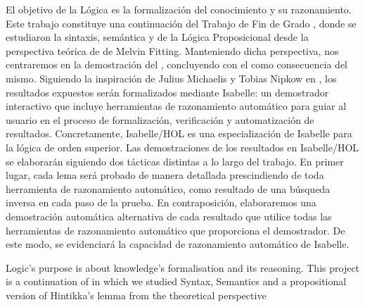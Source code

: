 %
\begin{isabellebody}%
%
%
\isadelimtheory
%
\endisadelimtheory
%
\isatagtheory
%
\endisatagtheory
{\isafoldtheory}%
%
\isadelimtheory
%
\endisadelimtheory
%
\begin{isamarkuptext}%
El objetivo de la Lógica es la formalización del conocimiento y su
razonamiento. Este trabajo constituye una continuación del Trabajo de Fin de
Grado  , donde se estudiaron
la sintaxis, semántica y  de la Lógica Proposicional
desde la perspectiva teórica de  
 de Melvin Fitting. Manteniendo dicha perspectiva, nos centraremos en la 
demostración del , concluyendo con 
el  como consecuencia del mismo. Siguiendo la inspiración de 
Julius Michaelis y Tobias Nipkow en  , los resultados 
expuestos serán formalizados mediante Isabelle: un demostrador 
interactivo que incluye herramientas de razonamiento automático para guiar al usuario 
en el proceso de formalización, verificación y automatización de resultados. 
Concretamente, Isabelle/HOL es una especialización de Isabelle para la lógica de orden 
superior. Las demostraciones de los resultados en Isabelle/HOL se elaborarán siguiendo 
dos tácticas distintas a lo largo del trabajo. En primer lugar, cada lema será probado 
de manera detallada prescindiendo de toda herramienta de razonamiento automático, como 
resultado de una búsqueda inversa en cada paso de la prueba. En contraposición, 
elaboraremos una demostración automática alternativa de cada resultado que utilice todas 
las herramientas de razonamiento automático que proporciona el demostrador. De este modo, 
se evidenciará la capacidad de razonamiento automático de Isabelle.%
\end{isamarkuptext}\isamarkuptrue%
%
\begin{isamarkuptext}%
Logic’s purpose is about knowledge’s formalisation and its 
reasoning. This project is a continuation of   in which we studied Syntax, Semantics and
a propositional version of Hintikka's lemma from the theoretical perspective 

\end{isamarkuptext}
\end{isabellebody}
